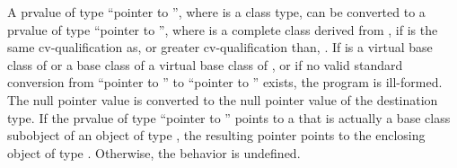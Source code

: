 \pnum
{}%
%
A prvalue of type ``pointer to  '', where 
is a class type, can be converted to a prvalue of type ``pointer to
 '',
where  is a complete class derived
from ,
if  is the same cv-qualification as,
or greater cv-qualification than, .
If  is a virtual base class of  or
a base class of a virtual base class of , or
if no valid standard conversion from ``pointer to ''
to ``pointer to '' exists, the program is ill-formed.
The null pointer value is converted
to the null pointer value of the destination type. If the prvalue of type
``pointer to  '' points to a  that is
actually a base class subobject of an object of type , the resulting
pointer points to the enclosing object of type . Otherwise, the
behavior is undefined.
%
%
%
%
%

